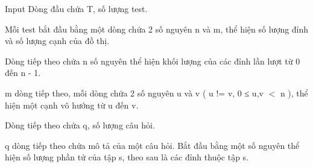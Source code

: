 Input
Dòng đầu chứa T, số lượng test.  

   Mỗi test bắt đầu bằng một dòng chứa 2 số nguyên n và  m, thể hiện số lượng đỉnh và số lượng cạnh của đồ thị.  

   Dòng tiếp theo chứa n số nguyên thể hiện khối lượng của các đỉnh lần lượt từ 0 đến n - 1.  

   m dòng tiếp theo, mỗi dòng chứa 2 số nguyên u và v ( u != v, 0 ≤ u,v $<$ n ), thể hiện một cạnh vô hướng từ u đến v.  

   Dòng tiếp theo chứa q, số lượng câu hỏi.  

   q dòng tiếp theo chứa mô tả của một câu hỏi. Bắt đầu bằng một số nguyên thể hiện số lượng phần tử của tập s, theo sau là các đỉnh thuộc tập s.